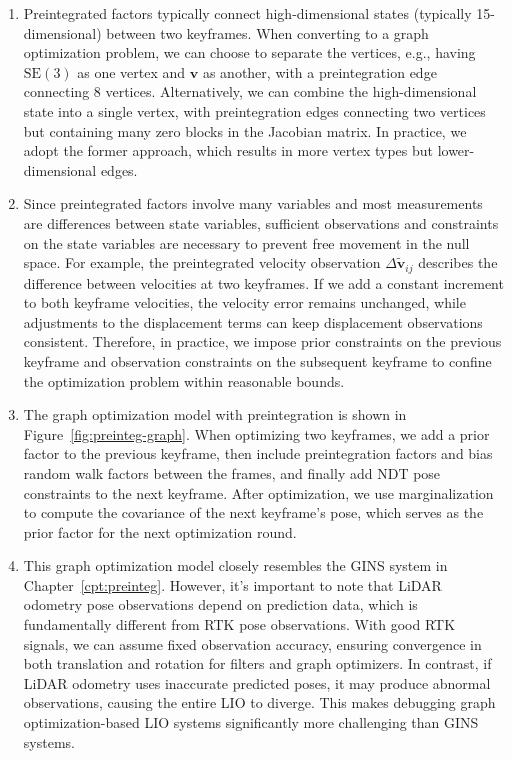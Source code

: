 \begin{enumerate}
	\item Preintegrated factors typically connect high-dimensional states (typically 15-dimensional) between two keyframes. When converting to a graph optimization problem, we can choose to separate the vertices, e.g., having $\mathrm{SE}(3)$ as one vertex and $\mathbf{v}$ as another, with a preintegration edge connecting 8 vertices. Alternatively, we can combine the high-dimensional state into a single vertex, with preintegration edges connecting two vertices but containing many zero blocks in the Jacobian matrix. In practice, we adopt the former approach, which results in more vertex types but lower-dimensional edges.
	
	\item Since preintegrated factors involve many variables and most measurements are differences between state variables, sufficient observations and constraints on the state variables are necessary to prevent free movement in the null space. For example, the preintegrated velocity observation $\Delta \tilde{\mathbf{v}}_{ij}$ describes the difference between velocities at two keyframes. If we add a constant increment to both keyframe velocities, the velocity error remains unchanged, while adjustments to the displacement terms can keep displacement observations consistent. Therefore, in practice, we impose prior constraints on the previous keyframe and observation constraints on the subsequent keyframe to confine the optimization problem within reasonable bounds.
	
	\item The graph optimization model with preintegration is shown in Figure~\ref{fig:preinteg-graph}. When optimizing two keyframes, we add a prior factor to the previous keyframe, then include preintegration factors and bias random walk factors between the frames, and finally add NDT pose constraints to the next keyframe. After optimization, we use marginalization to compute the covariance of the next keyframe's pose, which serves as the prior factor for the next optimization round.
	
	\item This graph optimization model closely resembles the GINS system in Chapter~\ref{cpt:preinteg}. However, it's important to note that LiDAR odometry pose observations depend on prediction data, which is fundamentally different from RTK pose observations. With good RTK signals, we can assume fixed observation accuracy, ensuring convergence in both translation and rotation for filters and graph optimizers. In contrast, if LiDAR odometry uses inaccurate predicted poses, it may produce abnormal observations, causing the entire LIO to diverge. This makes debugging graph optimization-based LIO systems significantly more challenging than GINS systems.
	

\end{enumerate}
